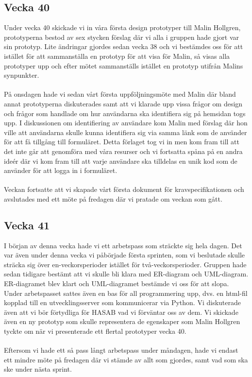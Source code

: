 \documentclass[12pt]{article}
\begin{document}
    \subsection{Vecka 40}
    Under vecka 40 skickade vi in våra första design prototyper till Malin Hollgren, prototyperna bestod av sex stycken förslag där vi alla i gruppen hade gjort var sin prototyp. Lite ändringar gjordes sedan vecka 38 och vi bestämdes oss för att istället för att sammanställa en prototyp för att visa för Malin, så visas alla prototyper upp och efter mötet sammanställs istället en prototyp utifrån Malins synpunkter. \\
    \\
    På onsdagen hade vi sedan vårt första uppföljningsmöte med Malin där bland annat prototyperna diskuterades samt att vi klarade upp vissa frågor om design och frågor som handlade om hur användarna ska identifiera sig på hemsidan togs upp. I diskussionen om identifiering av användare kom Malin med förslag där hon ville att användarna skulle kunna identifiera sig via samma länk som de använder för att få tillgång till formuläret. Detta förlaget tog vi in men kom fram till att det inte går att genomföra med våra resurser och vi fortsatta spåna på en andra ideér där vi kom fram till att varje användare ska tilldelas en unik kod som de använder för att logga in i formuläret. \\
    \\
    Veckan fortsatte att vi skapade vårt första dokument för kravspecifikationen och avslutades med ett möte på fredagen där vi pratade om veckan som gått.
    
    \subsection{Vecka 41}
    I början av denna vecka hade vi ett arbetspass som sträckte sig hela dagen. Det var även under denna vecka vi påbörjade första sprinten, som vi beslutade skulle sträcka sig över en-veckorsperioder istället för två-veckorsperioder. Gruppen hade sedan tidigare bestämt att vi skulle bli klara med ER-diagram och UML-diagram. ER-diagramet blev klart och UML-diagramet bestämde vi oss för att slopa. Under arbetspasset sattes även en bas för all programmering upp, dvs. en html-fil kopplad till en utvecklingsserver som kommunicerar via Python. Vi diskuterade även att vi bör förtydliga för HASAB vad vi förväntar oss av dem. Vi skickade även en ny prototyp som skulle representera de egenskaper som Malin Hollgren tyckte om när vi presenterade ett flertal prototyper vecka 40. \\
    \\
    Eftersom vi hade ett så pass långt arbetspass under måndagen, hade vi endast ett mindre möte på fredagen där vi stämde av allt som gjordes, samt vad som ska ske under nästa sprint.
    
\end{document}
